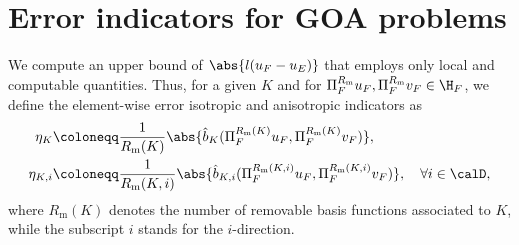 \section{Error indicators for GOA problems}
\label{sec:Indicators}
%
%
\begin{defn}
  We compute an upper bound of $\abs{l(u_{F} - u_{E})}$ that employs only local and computable quantities. Thus, for a given $K$ and for $\Pi_{F}^{R_{\textrm{m}}} u_{F}, \Pi_{F}^{R_{\textrm{m}}} v_{F} \in \H_{F}$, we define the element-wise error isotropic and anisotropic indicators as
  \begin{align}
    \eta_{K}    & \coloneqq \frac{1}{R_{\textrm{m}}(K)} \abs{\hat{b}_{K}(\Pi_{F}^{R_{\textrm{m}}(K)} u_{F},\Pi_{F}^{R_{\textrm{m}}(K)} v_{F})},\label{eq:erroriso} \                                         \\
    \eta_{K, i} & \coloneqq \frac{1}{R_{\textrm{m}}(K,i)} \abs{\hat{b}_{K, i}(\Pi_{F}^{R_{\textrm{m}}(K, i)} u_{F},\Pi_{F}^{R_{\textrm{m}}(K, i)} v_{F})}, \quad \forall i \in \calD \label{eq:erroranyiso},
  \end{align}
  where $R_{\textrm{m}}(K)$ denotes the number of removable basis functions associated to $K$, while the subscript $i$ stands for the $i$-direction.
\end{defn}

